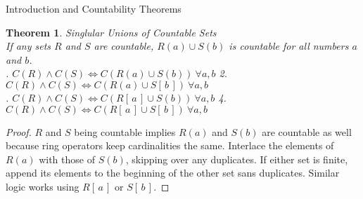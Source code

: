 \documentclass[12pt]{article}
\newtheorem{thm}{Theorem}
\begin{document}
\begin{section}{Introduction and Countability Theorems}
	\begin{thm}\label{thm:finite unions}
		\emph{
			Singlular Unions of Countable Sets\\
			\indent If any sets $R$ and $S$ are countable, $R(a)\cup S(b)$ is countable
			for all numbers $a$ and $b$.\vspace{0.4em}\\
			. $C(R)\land C(S)\iff C(R\left(a\right)\cup S\left(b\right))~\forall a,b$
			\hspace{1em}
			2. $C(R)\land C(S)\iff C(R\left(a\right)\cup S[\,b\,])~\forall a,b$\\
			. $C(R)\land C(S)\iff C(R[\,a\,]\cup S\left(b\right))~\forall a,b$
			\hspace{1em}
			4. $C(R)\land C(S)\iff C(R[\,a\,]\cup S[\,b\,])~\forall a,b$
		}
	\end{thm}\begin{proof}
		$R$ and $S$ being countable implies $R(a)$ and $S(b)$ are countable as well
		because ring operators keep cardinalities the same. Interlace the elements of
		$R(a)$ with those of $S(b)$, skipping over any duplicates. If either set is
		finite, append its elements to the beginning of the other set sans duplicates.
		Similar logic works using $R[\,a\,]$ or $S[\,b\,]$.
	\end{proof}


\end{section}
\end{document}
